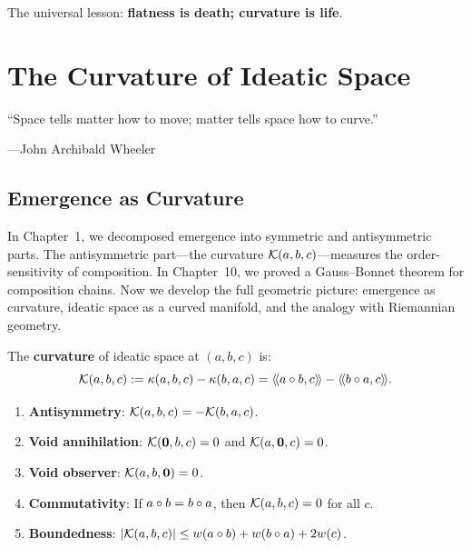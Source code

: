 The universal lesson: \textbf{flatness is death; curvature is life}.



\chapter{The Curvature of Ideatic Space}
\label{ch:curvature}

\epigraph{``Space tells matter how to move; matter tells space how to curve.''}
{---John Archibald Wheeler}


\section{Emergence as Curvature}

In Chapter~1, we decomposed emergence into symmetric and antisymmetric parts.
The antisymmetric part---the curvature $\mathcal{K}(a,b,c)$---measures the order-sensitivity
of composition. In Chapter~10, we proved a Gauss--Bonnet theorem for composition
chains. Now we develop the full geometric picture: emergence as curvature,
ideatic space as a curved manifold, and the analogy with Riemannian geometry.

\begin{definition}
\label{def:curvature}
The \textbf{curvature} of ideatic space at $(a, b, c)$ is:
\[
  \mathcal{K}(a, b, c) := \kappa(a, b, c) - \kappa(b, a, c)
  = \langle\!\langle a \circ b, c \rangle\!\rangle - \langle\!\langle b \circ a, c \rangle\!\rangle.
\]
\end{definition}

\begin{theorem}
\label{thm:curvature-properties}
\begin{enumerate}
  \item \textbf{Antisymmetry}: $\mathcal{K}(a, b, c) = -\mathcal{K}(b, a, c)$.
  \item \textbf{Void annihilation}: $\mathcal{K}(\mathbf{0}, b, c) = 0$ and
    $\mathcal{K}(a, \mathbf{0}, c) = 0$.
  \item \textbf{Void observer}: $\mathcal{K}(a, b, \mathbf{0}) = 0$.
  \item \textbf{Commutativity}: If $a \circ b = b \circ a$, then
    $\mathcal{K}(a, b, c) = 0$ for all $c$.
  \item \textbf{Boundedness}: $|\mathcal{K}(a, b, c)| \leq w(a \circ b)
    + w(b \circ a) + 2w(c)$.
\end{enumerate}
\end{theorem}

